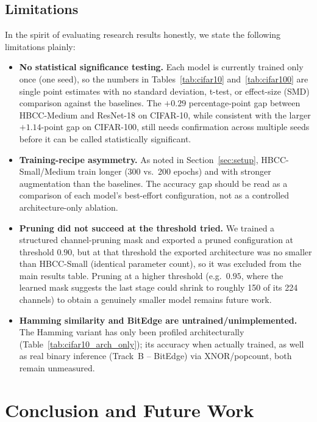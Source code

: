 \documentclass[journal]{IEEEtran}
\begin{document}
\subsection{Limitations}
\label{sec:limitations}

In the spirit of evaluating research results honestly, we state the following limitations plainly:

\begin{itemize}
    \item \textbf{No statistical significance testing.} Each model is currently trained only once (one seed), so the numbers in Tables~\ref{tab:cifar10} and~\ref{tab:cifar100} are single point estimates with no standard deviation, t-test, or effect-size (SMD) comparison against the baselines. The $+0.29$ percentage-point gap between HBCC-Medium and ResNet-18 on CIFAR-10, while consistent with the larger $+1.14$-point gap on CIFAR-100, still needs confirmation across multiple seeds before it can be called statistically significant.
    \item \textbf{Training-recipe asymmetry.} As noted in Section~\ref{sec:setup}, HBCC-Small/Medium train longer (300 vs.\ 200 epochs) and with stronger augmentation than the baselines. The accuracy gap should be read as a comparison of each model's best-effort configuration, not as a controlled architecture-only ablation.
    \item \textbf{Pruning did not succeed at the threshold tried.} We trained a structured channel-pruning mask and exported a pruned configuration at threshold $0.90$, but at that threshold the exported architecture was no smaller than HBCC-Small (identical parameter count), so it was excluded from the main results table. Pruning at a higher threshold (e.g.\ $0.95$, where the learned mask suggests the last stage could shrink to roughly 150 of its 224 channels) to obtain a genuinely smaller model remains future work.
    \item \textbf{Hamming similarity and BitEdge are untrained/unimplemented.} The Hamming variant has only been profiled architecturally (Table~\ref{tab:cifar10_arch_only}); its accuracy when actually trained, as well as real binary inference (Track~B -- BitEdge) via XNOR/popcount, both remain unmeasured.
\end{itemize}

\section{Conclusion and Future Work}
\end{document}
